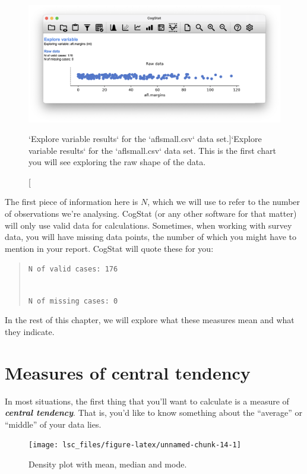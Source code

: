 \documentclass[
  11pt,
  a4paper,
  twoside,symmetric,openright]{book}
\theoremstyle{break}
\theoremstyle{break}
\begin{document}
\begin{figure}

{\centering \includegraphics[width=0.6\linewidth]{resources/image/cogstatrawaflsmall} 

}

\caption[`Explore variable results` for the `aflsmall.csv` data set.]{`Explore variable results` for the `aflsmall.csv` data set. This is the first chart you will see exploring the raw shape of the data.}\label{fig:rawaflsmall}
\end{figure}

The first piece of information here is \(N\), which we will use to refer to the number of observations we're analysing. CogStat (or any other software for that matter) will only use valid data for calculations. Sometimes, when working with survey data, you will have missing data points, the number of which you might have to mention in your report. CogStat will quote these for you:

\begin{quote}
\texttt{N\ of\ valid\ cases:\ 176}\strut \\
\texttt{N\ of\ missing\ cases:\ 0}
\end{quote}

In the rest of this chapter, we will explore what these measures mean and what they indicate.

\hypertarget{centraltendency}{%
\section{Measures of central tendency}\label{centraltendency}}

In most situations, the first thing that you'll want to calculate is a measure of \textbf{\emph{central tendency}}. That is, you'd like to know something about the ``average'' or ``middle'' of your data lies.

\begin{figure}

{\centering \texttt{[image: lsc\_files/figure-latex/unnamed-chunk-14-1]} 

}

\caption{Density plot with mean, median and mode.}\label{fig:unnamed-chunk-14}
\end{figure}
\end{document}
